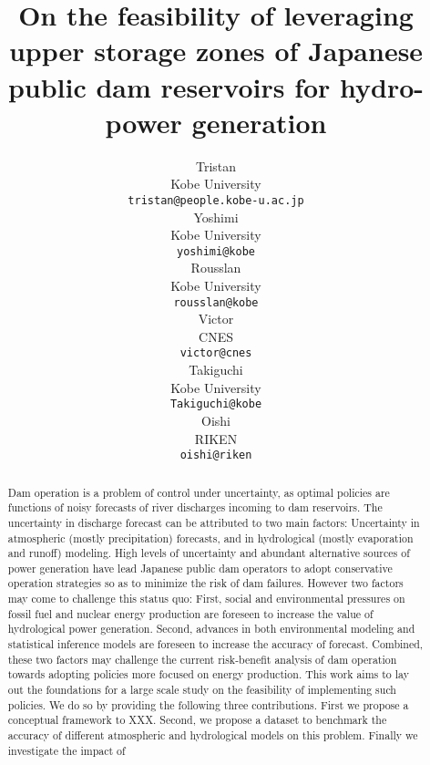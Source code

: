 \documentclass{article}
\title{
	On the feasibility of leveraging upper storage zones
        of Japanese public dam reservoirs for hydro-power generation
}
\author{ Tristan \\
	Kobe University\\
	\texttt{tristan@people.kobe-u.ac.jp} \\
	\And
	Yoshimi \\
	Kobe University\\
	\texttt{yoshimi@kobe} \\
	\And
	Rousslan \\
	Kobe University\\
	\texttt{rousslan@kobe} \\
	\And
	Victor \\
	CNES\\
	\texttt{victor@cnes} \\	
	\And
	Takiguchi \\
	Kobe University\\
	\texttt{Takiguchi@kobe} \\	
	\And
	Oishi \\
	RIKEN\\
	\texttt{oishi@riken} \\	
}
\date{}
\begin{document}
\maketitle

\begin{abstract}

Dam operation is a problem of control under uncertainty,
as optimal policies are functions of 
noisy forecasts of river discharges incoming to dam reservoirs.
The uncertainty in discharge forecast can be attributed to two main factors:
Uncertainty in atmospheric (mostly precipitation) forecasts,
and in hydrological (mostly evaporation and runoff) modeling.
High levels of uncertainty and abundant alternative sources of power generation
have lead Japanese public dam operators to adopt conservative operation strategies
so as to minimize the risk of dam failures.
However two factors may come to challenge this status quo:
First, social and environmental pressures on fossil fuel and nuclear energy production 
are foreseen to increase the value of hydrological power generation. 
Second, advances in both environmental modeling and statistical inference models
are foreseen to increase the accuracy of forecast.
Combined, these two factors may challenge the current risk-benefit analysis 
of dam operation towards adopting policies more focused on energy production.
This work aims to lay out the foundations for a large scale study 
on the feasibility of implementing such policies.
We do so by providing the following three contributions.
First we propose a conceptual framework to XXX.
Second, we propose a dataset to benchmark the accuracy 
of different atmospheric and hydrological models on this problem.
Finally we investigate the impact of

\end{abstract}
\end{document}
